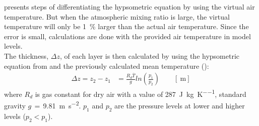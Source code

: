 \citet{martin_mid-latitude_2006} presents steps of differentiating the hypsometric equation by using the virtual air temperature. But when the atmospheric mixing ratio is large, the virtual temperature will only be \SI{1}{\percent} larger than the actual air temperature. Since the error is small, calculations are done with the provided air temperature in model levels.
\\
The thickness, $\Delta z$, of each layer is then calculated by using the hypsometric equation from \citet{martin_mid-latitude_2006} and the previously calculated mean temperature ():
\begin{equation}
\begin{split}
\Delta z  = z_2 - z_1 
& = \frac{R_d \overline{T}}{g} ln\left(\frac{p_1}{p_2} \right) \qquad [\SI{}{\metre}]
\end{split}
\label{eq:hypsometric}
\end{equation}
where $R_d$ is gas constant for dry air with a value of \SI{287}{\joule\per\kilogram\per\kelvin},  standard gravity $g\,=\,$\SI{9.81}{\metre\per\square\second}. $p_1$ and $p_2$ are the pressure levels at lower and higher levels %
($p_2 < p_1$).

